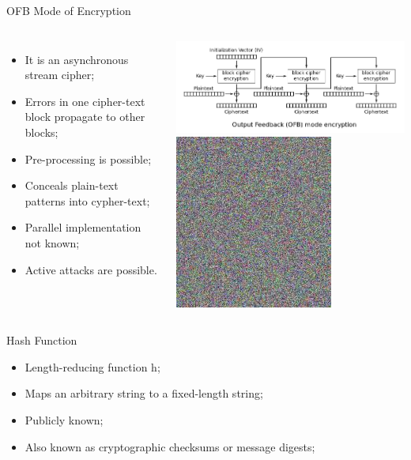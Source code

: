 \documentclass[12pt]{beamer}
\begin{document}
\begin{frame}{OFB Mode of Encryption}
\begin{columns}
\begin{itemize}
\item It is an asynchronous stream cipher;\pause
\item Errors in one cipher-text block propagate to other blocks;\pause
\item Pre-processing is possible;\pause
\item Conceals plain-text patterns into cypher-text;\pause
\item Parallel implementation not known;\pause
\item Active attacks are possible.\pause
\end{itemize}
\begin{center}
\includegraphics[scale=.25]{OFB_encryption.png}\pause\\
\includegraphics[scale=.35]{Tux_secure.jpg}
\end{center}
\end{columns}
\end{frame}

\begin{frame}{Hash Function}
\begin{itemize}
\item Length-reducing function h;\pause
\item Maps an arbitrary string to a fixed-length string;\pause
\item Publicly known;\pause
\item Also known as cryptographic checksums or message digests;\pause
\end{itemize}
\end{frame}
\end{document}
